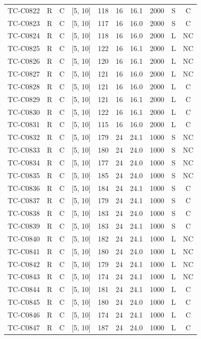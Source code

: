 \begin{longtable}{lccccccccc}
TC-C0822 & R & C & [5, 10] & 118 & 16 & 16.1 & 2000 & S & C \\
TC-C0823 & R & C & [5, 10] & 117 & 16 & 16.0 & 2000 & S & C \\
TC-C0824 & R & C & [5, 10] & 118 & 16 & 16.0 & 2000 & L & NC \\
TC-C0825 & R & C & [5, 10] & 122 & 16 & 16.1 & 2000 & L & NC \\
TC-C0826 & R & C & [5, 10] & 120 & 16 & 16.1 & 2000 & L & NC \\
TC-C0827 & R & C & [5, 10] & 121 & 16 & 16.0 & 2000 & L & NC \\
TC-C0828 & R & C & [5, 10] & 121 & 16 & 16.0 & 2000 & L & C \\
TC-C0829 & R & C & [5, 10] & 121 & 16 & 16.1 & 2000 & L & C \\
TC-C0830 & R & C & [5, 10] & 122 & 16 & 16.1 & 2000 & L & C \\
TC-C0831 & R & C & [5, 10] & 115 & 16 & 16.0 & 2000 & L & C \\
TC-C0832 & R & C & [5, 10] & 179 & 24 & 24.1 & 1000 & S & NC \\
TC-C0833 & R & C & [5, 10] & 180 & 24 & 24.0 & 1000 & S & NC \\
TC-C0834 & R & C & [5, 10] & 177 & 24 & 24.0 & 1000 & S & NC \\
TC-C0835 & R & C & [5, 10] & 185 & 24 & 24.0 & 1000 & S & NC \\
TC-C0836 & R & C & [5, 10] & 184 & 24 & 24.1 & 1000 & S & C \\
TC-C0837 & R & C & [5, 10] & 179 & 24 & 24.1 & 1000 & S & C \\
TC-C0838 & R & C & [5, 10] & 183 & 24 & 24.0 & 1000 & S & C \\
TC-C0839 & R & C & [5, 10] & 183 & 24 & 24.1 & 1000 & S & C \\
TC-C0840 & R & C & [5, 10] & 182 & 24 & 24.1 & 1000 & L & NC \\
TC-C0841 & R & C & [5, 10] & 180 & 24 & 24.0 & 1000 & L & NC \\
TC-C0842 & R & C & [5, 10] & 179 & 24 & 24.1 & 1000 & L & NC \\
TC-C0843 & R & C & [5, 10] & 174 & 24 & 24.1 & 1000 & L & NC \\
TC-C0844 & R & C & [5, 10] & 181 & 24 & 24.1 & 1000 & L & C \\
TC-C0845 & R & C & [5, 10] & 180 & 24 & 24.0 & 1000 & L & C \\
TC-C0846 & R & C & [5, 10] & 174 & 24 & 24.1 & 1000 & L & C \\
TC-C0847 & R & C & [5, 10] & 187 & 24 & 24.0 & 1000 & L & C \\

\end{longtable}

